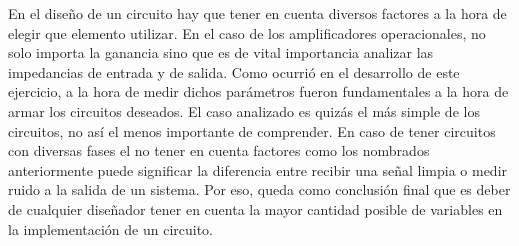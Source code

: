En el diseño de un circuito hay que tener en cuenta diversos factores a la hora de elegir que elemento utilizar. En el caso de los amplificadores operacionales, no solo importa la ganancia sino que es de vital importancia analizar las impedancias de entrada y de salida. Como ocurrió en el desarrollo de este ejercicio, a la hora de medir dichos parámetros fueron fundamentales a la hora de armar los circuitos deseados. El caso analizado es quizás el más simple de los circuitos, no así el menos importante de comprender. En caso de tener circuitos con diversas fases el no tener en cuenta factores como los nombrados anteriormente puede significar la diferencia entre recibir una señal limpia o medir ruido a la salida de un sistema. Por eso, queda como conclusión final que es deber de cualquier diseñador tener en cuenta la mayor cantidad posible de variables en la implementación de un circuito.